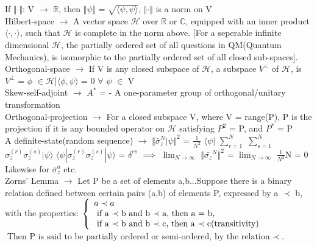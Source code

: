 \documentclass[10pt,fancy]{elegantbook}
\begin{document}
{\begin{definition}
If $\Vert \cdot \Vert$: V $\longrightarrow$ $\mathbb R$, then $\Vert \psi \Vert$ = $\sqrt{\langle \psi,\psi \rangle}$, 
$\Vert \cdot \Vert$ is a norm on V \\
 
Hilbert-space $\longrightarrow$ A vector space $\mathscr H$ over $\mathbb R$ or $\mathbb C$, equipped with an inner product $\langle \cdot, \cdot \rangle$,  
 such that $\mathscr H$ is complete in the norm above.       
 [For a seperable infinite dimensional $\mathscr H$, the partially ordered set of all questions in QM(Quantum Mechanics), is isomorphic
 to the partially ordered set of all closed sub-spaces].  \\

Orthogonal-space $\longrightarrow$ If V is any closed subspace of $\mathscr H$, a subspace $V^\perp$ of $\mathscr H$, is
$V^\perp$ = {$\phi$ $\in \mathscr H$|$\langle \phi, \psi \rangle$ = 0 $\forall$ $\psi$ $\in$ V}\\
  
Skew-self-adjoint $\longrightarrow$ $A^*$ = - A one-parameter group of orthogonal/unitary transformation \\

Orthogonal-projection $\longrightarrow$ For a closed subspace V, where V = range(P), P is the projection if it is any bounded operator
on $\mathscr H$ satisfying $P^2$ = P, and $P^*$ = P \\
 
A definite-state(random sequence) $\longrightarrow$  $\Vert \bar{\sigma}_z^{N} | \psi \Vert^2$ = $\frac{1}{N^2}$ $\langle \psi|$ $\sum_{r=1}^N$ $\sum_{s=1}^N$ $\sigma_z^{(r)}\sigma_z^{(s)}|\psi \rangle$  
$\langle \psi | \sigma_z^{(r)} \sigma_z^{(s)} | \psi \rangle$ = $\delta^{rs}$  
$\implies$ $\lim_{N \to \infty}$ $\Vert \bar{\sigma_z}^{N} \Vert^2$ = $\lim_{N \to \infty}$ $\frac{1}{N^2}$N = 0  
Likewise for $\bar{\sigma}_z^a$ etc.  \\

Zorns' Lemma $\longrightarrow$ Let P be a set of elements a,b...Suppose there is a binary relation defined between certain pairs (a,b) of elements P,
expressed by a $\prec$ b, with the properties:  $\left\{
            \begin{array}{ll}
            a \prec a \\
            \text{ if a $\prec$ b and b $\prec$ a, then a = b,} \\
            \text{ if a $\prec$ b and b $\prec$ c, then a $\prec$ c(transitivity)} \\
            \end{array} \\
            \right.$  $\text{Then P is said to be partially ordered or semi-ordered, by the relation $\prec$}$.  \\


\end{definition}}
\end{document}

